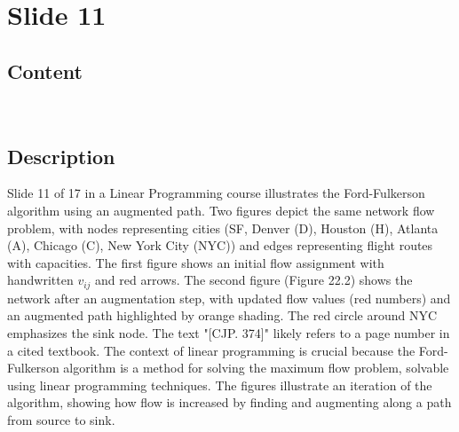 \documentclass{article}%
\begin{document}
%
\newpage%
\section{Slide 11}%
\label{sec:Slide11}%
\subsection{Content}%

 \\
\text{[CJP. 374}
%
\subsection{Description}%
Slide 11 of 17 in a Linear Programming course illustrates the Ford-Fulkerson algorithm using an augmented path. Two figures depict the same network flow problem, with nodes representing cities (SF, Denver (D), Houston (H), Atlanta (A), Chicago (C), New York City (NYC)) and edges representing flight routes with capacities. The first figure shows an initial flow assignment with handwritten $v_{ij}$ and red arrows. The second figure (Figure 22.2) shows the network after an augmentation step, with updated flow values (red numbers) and an augmented path highlighted by orange shading.  The red circle around NYC emphasizes the sink node. The text "[CJP. 374]" likely refers to a page number in a cited textbook. The context of linear programming is crucial because the Ford-Fulkerson algorithm is a method for solving the maximum flow problem, solvable using linear programming techniques. The figures illustrate an iteration of the algorithm, showing how flow is increased by finding and augmenting along a path from source to sink.%
\end{document}
